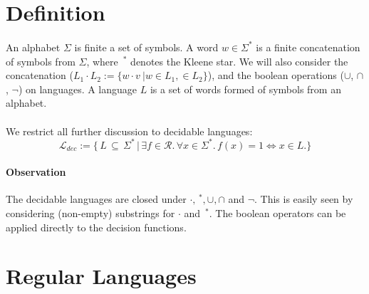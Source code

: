 \documentclass[11pt,a4paper,oneside]{book}
\begin{document}
    \section{Definition}
        \paragraph{}
        An alphabet $\Sigma$ is finite a set of symbols. A word $w \in \Sigma^*$ is a finite concatenation of symbols from $\Sigma$, where $\,^*$ denotes the Kleene star. We will also consider the concatenation ($L_1 \cdot L_2 := \{w \cdot v\ \vert w \in L_1,  \in L_2\}$), and the boolean operations ($\cup$, $\cap$, $\neg$) on languages.
        A language $L$ is a set of words formed of symbols from an alphabet. 

        
        \paragraph{} We restrict all further discussion to decidable languages:
        \[
            \mathcal{L}_{dec} := \{ \, L \, \subseteq \, \Sigma^* \, 
                \vert \, \exists f \in \mathcal{R}. \, \forall x \in \Sigma^*. \, f(x) = 1 \Leftrightarrow  x \in L. \}
        \] 

        \paragraph{Observation} The decidable languages are closed under $\cdot, \,^*, \cup, \cap$ and $\neg$. This is easily seen by considering (non-empty) substrings for $\cdot$ and $\,^*$. The boolean operators can be applied directly to the decision functions.

        \section{Regular Languages}
        
    
\end{document}
